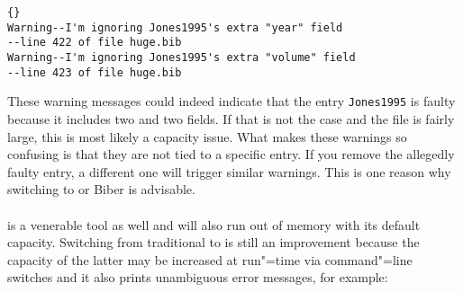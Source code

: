 \documentclass{ltxdockit}[2011/03/25]
\newcommand*{\biber}{Biber\xspace}
\begin{document}
\begin{lstlisting}[style=plain]{}
Warning--I'm ignoring Jones1995's extra "year" field
--line 422 of file huge.bib
Warning--I'm ignoring Jones1995's extra "volume" field
--line 423 of file huge.bib
\end{lstlisting}
%
These warning messages could indeed indicate that the entry \texttt{Jones1995} is faulty because it includes two  and two  fields. If that is not the case and the  file is fairly large, this is most likely a capacity issue. What makes these warnings so confusing is that they are not tied to a specific entry. If you remove the allegedly faulty entry, a different one will trigger similar warnings. This is one reason why switching to  or \biber is advisable.

\paragraph{}
 is a venerable tool as well and will also run out of memory with its default capacity. Switching from traditional \bibtex to  is still an improvement because the capacity of the latter may be increased at run"=time via command"=line switches and it also prints unambiguous error messages, for example:
\end{document}
